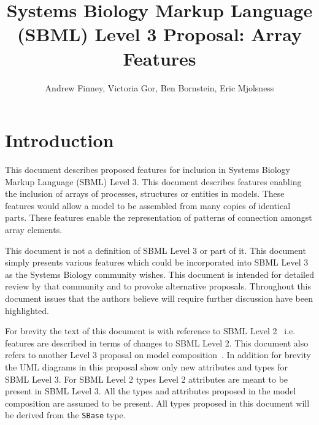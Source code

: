 \documentclass{cekarticle}
\begin{document}

\title{Systems Biology Markup Language (SBML) Level 3 Proposal: Array Features}

\author{Andrew Finney, Victoria Gor, Ben Bornstein, Eric Mjolsness}


\maketitlepage

\section{Introduction}
\label{sec:introduction}

This document describes proposed features for inclusion in
Systems Biology Markup Language (SBML) Level 3. This document
describes features enabling the inclusion of arrays of processes,
structures or entities in models.  These features would allow a
model to be assembled from many copies of identical parts.  These
features enable the representation of patterns of connection
amongst array elements.

This document is not a definition of SBML Level 3 or part of it.
This document simply presents various features which could be
incorporated into SBML Level 3 as the Systems Biology community
wishes.  This document is intended for detailed review by that
community and to provoke alternative proposals.  Throughout this
document issues that the authors believe will require further
discussion have been highlighted.

For brevity the text of this document is with reference to SBML
Level 2~\citep{finney:2002f} i.e. features are described in terms
of changes to SBML Level 2.  
This document
also refers to another Level 3 proposal on model composition~\citep{finney:2003b}.
In addition for brevity the UML diagrams in this proposal
show only new attributes and types for SBML Level 3.  For SBML Level 2 types Level 2
attributes are meant to be present in SBML Level 3.  All the types and attributes
proposed in the model composition are assumed to be present.
All types proposed in this document will be derived from the
\texttt{SBase} type.
\end{document}
